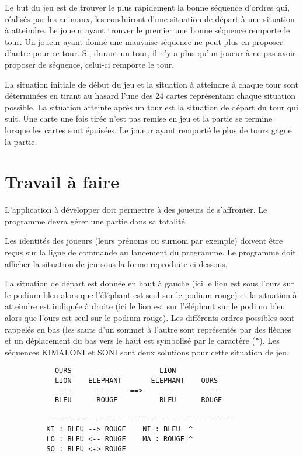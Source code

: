 \documentclass[10pt,a4paper,oneside]{article}
\begin{document}
Le but du jeu est de trouver le plus rapidement la bonne séquence d'ordres qui, réalisés par les animaux, les conduiront d'une situation de départ à une situation à atteindre. Le joueur ayant trouver le premier une bonne séquence remporte le tour. Un joueur ayant donné une mauvaise séquence ne peut plus en proposer d'autre pour ce tour. Si, durant un tour, il n'y a plus qu'un joueur à ne pas avoir proposer de séquence, celui-ci remporte le tour. 

\medskip

La situation initiale de début du jeu et la situation à atteindre à chaque tour sont déterminées en tirant au hasard l'une des 24 cartes représentant chaque situation possible. La situation atteinte après un tour est la situation de départ du tour qui suit. Une carte une fois tirée n'est pas remise en jeu et la partie se termine lorsque les cartes sont épuisées. Le joueur ayant remporté le plus de tours gagne la partie.
 
\section{Travail à faire}

L'application à développer doit permettre à des joueurs de s'affronter. Le programme devra gérer une partie dans sa totalité.

Les identités des joueurs (leurs prénoms ou surnom par exemple) doivent être reçus sur la ligne de commande au lancement du programme. Le programme doit afficher la situation de jeu sous la forme reproduite ci-dessous.

La situation de départ est donnée en haut à gauche (ici le lion est sous l'ours sur le podium bleu alors que l'éléphant est seul sur le podium rouge) et la situation à atteindre est indiquée à droite (ici le lion est sur l'éléphant sur le podium bleu alors que l'ours est seul sur le podium rouge). Les différents ordres possibles sont rappelés en bas (les sauts d'un sommet à l'autre sont représentés par des flèches et un déplacement du bas vers le haut est symbolisé par le caractère (\verb'^'). Les séquences KIMALONI et SONI sont deux solutions pour cette situation de jeu.

\begin{verbatim}
            OURS                     LION
            LION    ELEPHANT       ELEPHANT    OURS
            ----      ----    ==>    ----      ----
            BLEU      ROUGE          BLEU      ROUGE
	
          --------------------------------------------
          KI : BLEU --> ROUGE    NI : BLEU  ^
          LO : BLEU <-- ROUGE    MA : ROUGE ^    
          SO : BLEU <-> ROUGE
\end{verbatim}
\end{document}
